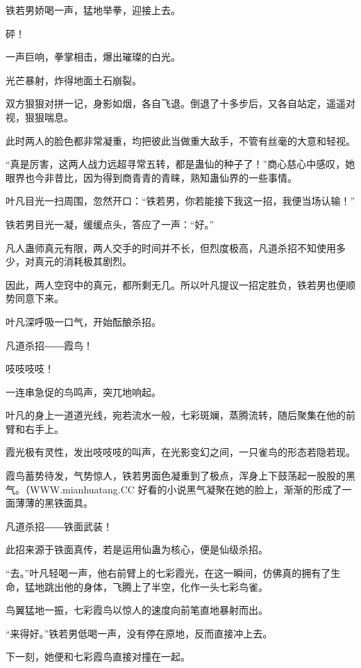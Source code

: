 
\begin{this_body}

铁若男娇喝一声，猛地举拳，迎接上去。

砰！

一声巨响，拳掌相击，爆出璀璨的白光。

光芒暴射，炸得地面土石崩裂。

双方狠狠对拼一记，身影如烟，各自飞退。倒退了十多步后，又各自站定，遥遥对视，狠狠喘息。

此时两人的脸色都非常凝重，均把彼此当做重大敌手，不管有丝毫的大意和轻视。

“真是厉害，这两人战力远超寻常五转，都是蛊仙的种子了！”商心慈心中感叹，她眼界也今非昔比，因为得到商青青的青睐，熟知蛊仙界的一些事情。

叶凡目光一扫周围，忽然开口：“铁若男，你若能接下我这一招，我便当场认输！”

铁若男目光一凝，缓缓点头，答应了一声：“好。”

凡人蛊师真元有限，两人交手的时间并不长，但烈度极高，凡道杀招不知使用多少，对真元的消耗极其剧烈。

因此，两人空窍中的真元，都所剩无几。所以叶凡提议一招定胜负，铁若男也便顺势同意下来。

叶凡深呼吸一口气，开始酝酿杀招。

凡道杀招――霞鸟！

吱吱吱吱！

一连串急促的鸟鸣声，突兀地响起。

叶凡的身上一道道光线，宛若流水一般，七彩斑斓，蒸腾流转，随后聚集在他的前臂和右手上。

霞光极有灵性，发出吱吱吱的叫声，在光影变幻之间，一只雀鸟的形态若隐若现。

霞鸟蓄势待发，气势惊人，铁若男面色凝重到了极点，浑身上下鼓荡起一股股的黑气。（WWW.mianhuatang.CC 好看的小说黑气凝聚在她的脸上，渐渐的形成了一面薄薄的黑铁面具。

凡道杀招――铁面武装！

此招来源于铁面真传，若是运用仙蛊为核心，便是仙级杀招。

“去。”叶凡轻喝一声，他右前臂上的七彩霞光，在这一瞬间，仿佛真的拥有了生命，猛地跳出他的身体，飞腾上了半空，化作一头七彩鸟雀。

鸟翼猛地一振，七彩霞鸟以惊人的速度向前笔直地暴射而出。

“来得好。”铁若男低喝一声，没有停在原地，反而直接冲上去。

下一刻，她便和七彩霞鸟直接对撞在一起。


\end{this_body}
